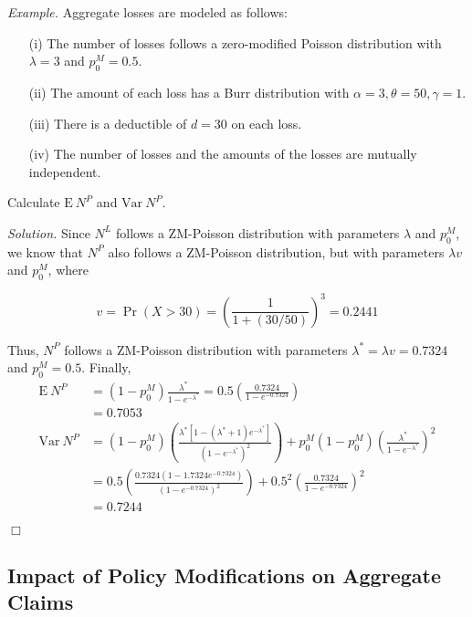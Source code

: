 \documentclass[12pt,letterpaper]{article}
\begin{document}

\noindent \textit{Example.} Aggregate losses are modeled as follows:
\begin{enumerate}
\item[(i)] The number of losses follows a zero-modified Poisson distribution with $\lambda=3$ and $p_0^M = 0.5$.
\item[(ii)] The amount of each loss has a Burr distribution with $\alpha=3, \theta=50, \gamma=1$.
\item[(iii)] There is a deductible of $d=30$ on each loss.
\item[(iv)] The number of losses and the amounts of the losses are mutually independent.
\end{enumerate}
Calculate $\mathrm{E~} N^P$ and $\mathrm{Var~} N^P$.

\bigskip

\noindent \textit{Solution.} Since $N^L$ follows a ZM-Poisson distribution with parameters $\lambda$ and $p_0^M$, we know that $N^P$ also follows a ZM-Poisson distribution, but with parameters $\lambda v$ and $p_0^M$, where

$$v = \Pr(X>30) = \left( \frac{1}{1+(30/50)} \right)^3 = 0.2441$$

Thus, $N^P$ follows a ZM-Poisson distribution with parameters $\lambda^\ast = \lambda v= 0.7324$ and $p_0^M = 0.5$. Finally,
\begin{align*}
\mathrm{E~} N^P &= (1-p_0^M) \frac{\lambda^\ast}{1-e^{-\lambda^\ast}} = 0.5 \left( \frac{0.7324}{1-e^{-0.7324}} \right) \\
&= 0.7053 \\
\mathrm{Var~} N^P &= (1-p_0^M) \left( \frac{\lambda^\ast[1-(\lambda^\ast + 1) e^{-\lambda^\ast}]}{(1-e^{-\lambda^\ast})^2} \right) + p_0^M(1-p_0^M) \left(\frac{\lambda^\ast}{1-e^{-\lambda^\ast}} \right)^2 \\
&= 0.5 \left( \frac{0.7324(1-1.7324 e^{-0.7324})}{(1-e^{-0.7324})^2} \right) + 0.5^2 \left( \frac{0.7324}{1-e^{-0.7324}} \right)^2 \\
&= 0.7244
\end{align*}
\begin{flushright}$\Box$\end{flushright}


\subsection{Impact of Policy Modifications on Aggregate Claims}
\end{document}
